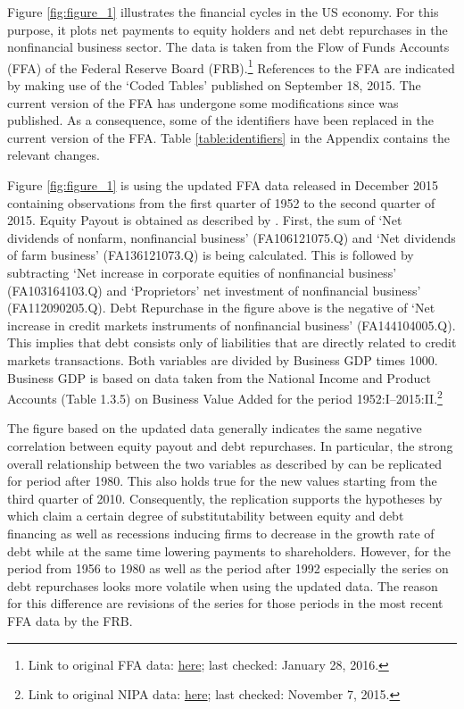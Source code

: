 \documentclass[12pt,a4paper,leqno]{article}
\begin{document}
Figure \ref{fig:figure_1} illustrates the financial cycles in the US economy. For this purpose, it plots net payments to equity holders and net debt repurchases in the nonfinancial business sector. The data is taken from the Flow of Funds Accounts (FFA) of the Federal Reserve Board (FRB).\footnote{Link to original FFA data: \href{http://www.federalreserve.gov/datadownload/Download.aspx?rel=Z1&series=1f08e962a27dff21b89a7212d58b8346&filetype=spreadsheetml&label=include&layout=seriescolumn&from=03/01/1952&to=06/30/2015}{here}; last checked: January 28, 2016.}
References to the FFA are indicated by making use of the ‘Coded Tables’ published on September 18, 2015. The current version of the FFA has undergone some modifications since \citet{JERMANNfinancial} was published. As a consequence, some of the identifiers have been replaced in the current version of the FFA. Table \ref{table:identifiers} in the Appendix contains the relevant changes.

Figure \ref{fig:figure_1} is using the updated FFA data released in December 2015 containing observations from the first quarter of 1952 to the second quarter of 2015. Equity Payout is obtained as described by \citeauthor{JERMANNfinancial}. First, the sum of ‘Net dividends of nonfarm, nonfinancial business’ (FA106121075.Q) and ‘Net dividends of farm business’ (FA136121073.Q) is being calculated. This is followed by subtracting ‘Net increase in corporate equities of nonfinancial business’ (FA103164103.Q) and ‘Proprietors’ net investment of nonfinancial business’ (FA112090205.Q). Debt Repurchase in the figure above is the negative of ‘Net increase in credit markets instruments of nonfinancial business’ (FA144104005.Q). This implies that debt consists only of liabilities that are directly related to credit markets transactions. Both variables are divided by Business GDP times 1000. Business GDP is based on data taken from the National Income and Product Accounts (Table 1.3.5) on Business Value Added for the period 1952:I--2015:II.\footnote{Link to original NIPA data: \href{http://www.bea.gov//national/nipaweb/DownSS2.asp}{here}; last checked: November 7, 2015.} 

The figure based on the updated data generally indicates the same negative correlation between equity payout and debt repurchases. In particular, the strong overall relationship between the two variables as described by \citeauthor{JERMANNfinancial} can be replicated for period after 1980. This also holds true for the new values starting from the third quarter of 2010. Consequently, the replication supports the hypotheses by \citeauthor{JERMANNfinancial} which claim a certain degree of substitutability between equity and debt financing as well as recessions inducing firms to decrease in the growth rate of debt while at the same time lowering payments to shareholders. However, for the period from 1956 to 1980 as well as the period after 1992 especially the series on debt repurchases looks more volatile when using the updated data. The reason for this difference are revisions of the series for those periods in the most recent FFA data by the FRB.
\end{document}
